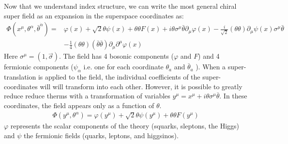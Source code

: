 Now that we understand index structure, we can write the most general chiral super field as an expansion in the superspace coordinates as:
\begin{align*}
\Phi(x^\mu, \theta^\alpha, \bar{\theta}^{\dot{\alpha}}) = &\varphi(x) + \sqrt{2} \theta \psi(x) + \theta \theta F(x) + i \theta \sigma^\mu \bar{\theta} \partial_\mu \varphi(x) - \frac{i}{\sqrt{2} } (\theta\theta) \partial_\mu \psi(x) \sigma^\mu \bar{\theta}\\
& - \frac{1}{4}( \theta \theta ) (\bar{\theta} \bar{\theta} ) \partial_\mu \partial^\mu \varphi(x)
\end{align*}
Here $\sigma^\mu = (1, \vec \sigma)$. The field has 4 bosonic components ($\varphi$ and $F$) and 4 fermionic components ($\psi_\alpha$ i.e. one for each coordinate  $\theta_a$ and $\bar{\theta}_a$ ). When a super-translation is
 applied to the field, the individual coefficients of the super-coordinates will 
will transform into each other. However, it is possible to greatly reduce reduce therms with a transformation of variables $y^\mu = x^\mu + i \theta \sigma^\mu \bar{\theta}$. In these coordinates, the field appears only as a function of $\theta$.
\begin{align*}
\Phi(y^\mu, \theta^\alpha) = \varphi(y^\mu) + \sqrt{2} \theta \psi(y^\mu) + \theta \theta F(y^\mu) 
\end{align*}
$\varphi$ represents  the scalar components of the theory (squarks, sleptons, the Higgs) and $\psi$ the fermionic 
fields (quarks, leptons, and higgsinos). 

